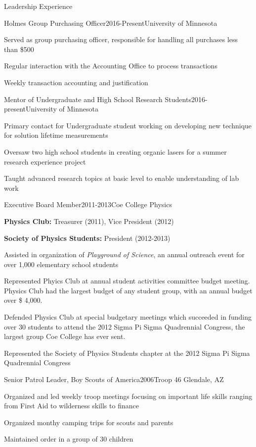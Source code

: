 \documentclass{resume} %
\begin{document}
\begin{rSection}{Leadership Experience}

\begin{rSubsection}{Holmes Group Purchasing Officer}{2016-Present}{University of Minnesota}{}
\item Served as group purchasing officer, responsible for handling all purchases less than \$500
\item Regular interaction with the Accounting Office to process transactions
\item Weekly transaction accounting and justification
\end{rSubsection}

\begin{rSubsection}{Mentor of Undergraduate and High School Research Students}{2016-present}{University of Minnesota}{}
\item Primary contact for Undergraduate student working on developing new technique for solution lifetime measurements
\item Oversaw two high school students in creating organic lasers for a summer research experience project
\item Taught advanced research topics at basic level to enable understanding of lab work
\end{rSubsection}

\begin{rSubsection}{Executive Board Member}{2011-2013}{Coe College Physics}{}
\item \textbf{Physics Club:} Treasurer (2011), Vice President (2012)
\item \textbf{Society of Physics Students:} President (2012-2013)
\item Assisted in organization of {\em Playground of Science}, an annual outreach event for over 1,000 elementary school students
\item Represented Phyics Club at annual student activities committee budget meeting.  Physics Club had the largest budget of any student group, with an annual budget over \$ 4,000.
\item Defended Physics Club at special budgetary meetings which succeeded in funding over 30 students to attend the 2012 Sigma Pi Sigma Quadrennial Congress, the largest group Coe College has ever sent.
\item Represented the Society of Physics Students chapter at the 2012 Sigma Pi Sigma Quadrennial Congress
\end{rSubsection}

\begin{rSubsection}{Senior Patrol Leader, Boy Scouts of America}{2006}{Troop 46 Glendale, AZ}{}
\item Organized and led weekly troop meetings focusing on important life skills ranging from First Aid to wilderness skills to finance
\item Organized monthy camping trips for scouts and parents
\item Maintained order in a group of 30 children
\end{rSubsection}

\end{rSection}
\end{document}
